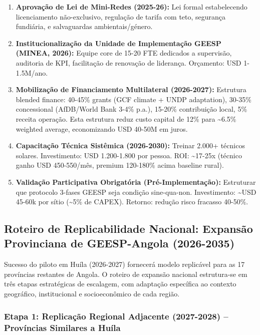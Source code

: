 \documentclass[12pt, a4paper]{article}
\begin{document}
\begin{enumerate}
\item \textbf{Aprovação de Lei de Mini-Redes (2025-26):} Lei formal estabelecendo licenciamento não-exclusivo, regulação de tarifa com teto, segurança fundiária, e salvaguardas ambientais/género.

\item \textbf{Institucionalização da Unidade de Implementação GEESP (MINEA, 2026):} Equipe core de 15-20 FTE dedicados a supervisão, auditoria de KPI, facilitação de renovação de liderança. Orçamento: USD 1-1.5M/ano.

\item \textbf{Mobilização de Financiamento Multilateral (2026-2027):} Estrutura blended finance: 40-45\% grants (GCF climate + UNDP adaptation), 30-35\% concessional (AfDB/World Bank 3-4\% p.a.), 15-20\% contribuição local, 5\% receita operação. Esta estrutura reduz custo capital de 12\% para \textasciitilde{}6.5\% weighted average, economizando USD 40-50M em juros.

\item \textbf{Capacitação Técnica Sistêmica (2026-2030):} Treinar 2.000+ técnicos solares. Investimento: USD 1.200-1.800 por pessoa. ROI: \textasciitilde{}17-25x (técnico ganho USD 450-550/mês, premium 120-180\% acima baseline rural).

\item \textbf{Validação Participativa Obrigatória (Pré-Implementação):} Estruturar que protocolo 3-fases GEESP seja condição sine-qua-non. Investimento: \textasciitilde{}USD 45-60k por sítio (\textasciitilde{}5\% de CAPEX). Retorno: redução risco fracasso 40-50\%.
\end{enumerate}

\subsection{Roteiro de Replicabilidade Nacional: Expansão Provinciana de GEESP-Angola (2026-2035)}

Sucesso do piloto em Huíla (2026-2027) fornecerá modelo replicável para as 17 províncias restantes de Angola. O roteiro de expansão nacional estrutura-se em três etapas estratégicas de escalagem, com adaptação específica ao contexto geográfico, institucional e socioeconômico de cada região.

\subsubsection{Etapa 1: Replicação Regional Adjacente (2027-2028) -- Províncias Similares a Huíla}
\end{document}
